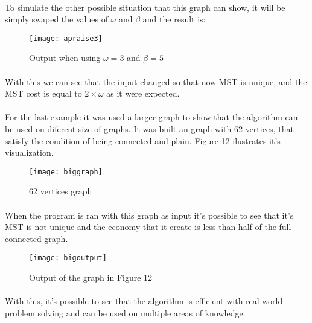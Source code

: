\documentclass[titlepage]{article}
\begin{document}
    \paragraph{}
    To simulate the other possible situation that this graph can show, it will be simply swaped the values of $\omega$ and $\beta$ and the result is:
    \begin{figure}[h]
        \begin{center}
            \texttt{[image: apraise3]}
            \caption{Output when using $\omega=3$ and $\beta=5$}
        \end{center}
    \end{figure}
    \paragraph{}
    With this we can see that the input changed so that now MST is unique, and the MST cost is equal to $2\times\omega$ as it were expected.
    \paragraph{}
    For the last example it was used a larger graph to show that the algorithm can be used on diferent size of graphs. It was built an graph with 62 vertices, that satisfy the condition of being connected and plain. Figure 12 ilustrates it's visualization.
    \begin{figure}[h]
        \begin{center}
            \texttt{[image: biggraph]}
            \caption{62 vertices graph}
        \end{center}
    \end{figure}
    \paragraph{}
    When the program is ran with this graph as input it's possible to see that it's MST is not unique and the economy that it create is less than half of the full connected graph.
    \begin{figure}[h]
        \begin{center}
            \texttt{[image: bigoutput]}
            \caption{Output of the graph in Figure 12}
        \end{center}
    \end{figure}
    \paragraph{}
    With this, it's possible to see that the algorithm is efficient with real world problem solving and can be used on multiple areas of knowledge. 
\end{document}
